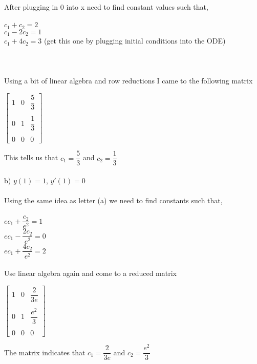 \documentclass[12pt]{exam}
\begin{document}
After plugging in 0 into x need to find constant values such that,\\\\
$c_1+c_2=2$\\
$c_1-2c_2=1$\\
$c_1+4c_2=3$ (get this one by plugging initial conditions into the ODE)\\\\\\\\
Using a bit of linear algebra and row reductions I came to the following matrix
\begin{center}$\begin{bmatrix}
1 & 0 & \dfrac{5}{3}\\\\
0 & 1 & \dfrac{1}{3}\\\\
0 & 0 & 0
\end{bmatrix}$\end{center}
This tells us that $c_1=\dfrac{5}{3}$ and $c_2=\dfrac{1}{3}$\\\\
b) $y(1)=1$, $y'(1)=0$\\\\
Using the same idea as letter (a) we need to find constants such that,\\\\
$ec_1+\dfrac{c_2}{e^2}=1$\\
$ec_1-\dfrac{2c_2}{e^2}=0$\\
$ec_1+\dfrac{4c_2}{e^2}=2$\\\\
Use linear algebra again and come to a reduced matrix
\begin{center}$\begin{bmatrix}
1 & 0 & \dfrac{2}{3e}\\\\
0 & 1 & \dfrac{e^2}{3}\\\\
0 & 0 & 0
\end{bmatrix}$\end{center}
The matrix indicates that $c_1=\dfrac{2}{3e}$ and $c_2=\dfrac{e^2}{3}$
\end{document}

